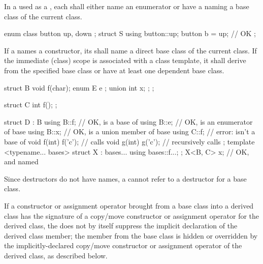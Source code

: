 \pnum
In a  used as a
,
each 
shall either name an enumerator
or have a 
naming a base class of the current class.
\begin{example}
\begin{codeblock}
enum class button { up, down };
struct S {
  using button::up;
  button b = up;                // OK
};
\end{codeblock}
\end{example}
If a
 names a constructor,
its  shall name
a direct base class of the current class.
If the immediate (class) scope is associated with a class template,
it shall derive from the specified base class or
have at least one dependent base class.
\begin{example}
\begin{codeblock}
struct B {
  void f(char);
  enum E { e };
  union { int x; };
};

struct C {
  int f();
};

struct D : B {
  using B::f;                   // OK,  is a base of 
  using B::e;                   // OK,  is an enumerator of base 
  using B::x;                   // OK,  is a union member of base 
  using C::f;                   // error:  isn't a base of 
  void f(int) { f('c'); }       // calls 
  void g(int) { g('c'); }       // recursively calls 
};
template <typename... bases>
struct X : bases... {
  using bases::f...;
};
X<B, C> x;                      // OK,  and  named
\end{codeblock}
\end{example}

\pnum
\begin{note}
Since destructors do not have names, a
 cannot refer to a
destructor for a base class.
\end{note}
If a constructor or assignment operator brought from a base class into a derived class
has the signature of a copy/move constructor or assignment operator
for the derived class,
the  does not by itself
suppress the implicit declaration of the derived class member;
the member from the base class is hidden or overridden
by the implicitly-declared copy/move constructor or assignment operator
of the derived class, as described below.

